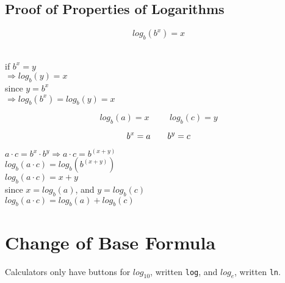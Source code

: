 \documentclass[12pt]{article}
\begin{document}
\hrulefill

\subsection{Proof of Properties of Logarithms}

\vspace{6pt}

\begin{Large}
$$log_{b}(b^{x})=x$$\\
\end{Large}

if $b^{x}=y$\\

$\Rightarrow log_{b}(y)=x$\\

since $y=b^x$\\

$\Rightarrow log_{b}(b^{x})=log_{b}(y)=x$

\hrulefill

\begin{Large}

$$log_b(a)=x \hspace{1cm} log_b(c)=y$$

$$b^x=a \hspace{.7cm} b^y=c$$

\end{Large}

\vspace{6pt}

$a \cdot c = b^x \cdot b^y \Longrightarrow a \cdot c = b^{(x+y)}$ \\

$log_b(a \cdot c) = log_b\left(b^{(x+y)}\right)$\\

$log_b(a \cdot c) = x+y$\\

since $x=log_b(a)$, and $y=log_b(c)$\\

$log_b(a \cdot c) = log_b(a)+log_b(c)$





\section{Change of Base Formula}

Calculators only have buttons for $log_{10}$, written \texttt{log}, and $log_e$, written \texttt{ln}. \\
\end{document}
